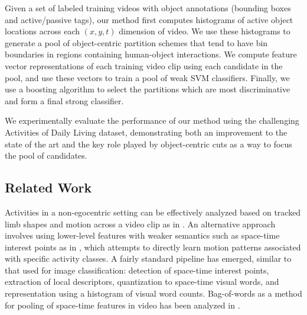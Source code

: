 \documentclass[12pt]{article} %
\begin{document}
  Given a set of labeled training videos with object annotations (bounding boxes and
  active/passive tags), our method first computes histograms of active
  object locations across each $(x,y,t)$ dimension of video. We use these
  histograms to generate a pool of object-centric partition schemes that 
  tend to have bin boundaries in regions containing human-object interactions.
  We compute feature vector representations of each training video clip using each
  candidate in the pool, and use these vectors to train a pool of weak SVM
  classifiers. Finally, we use a boosting algorithm to select the partitions
  which are most discriminative and form a final strong classifier.






  We experimentally evaluate the performance of our method using the
  challenging Activities of Daily Living dataset, demonstrating both an
  improvement to the state of the art and the key role played by
  object-centric cuts as a way to focus the pool of candidates.



	

\subsection{Related Work}

  Activities in a non-egocentric setting can be effectively analyzed based
  on tracked limb shapes and motion across a video clip as in 
  \cite{Ramanan03, Rao01, Rodriguez08}. An
  alternative approach involves using lower-level features with weaker
  semantics such as space-time interest points as in \cite{Schuldt04,
  Laptev08, Marszalek09}, which attempts to directly learn motion patterns
  associated with specific activity classes. A fairly standard pipeline has
  emerged, similar to that used for image classification: detection of space-time
  interest points, extraction of local descriptors, quantization to space-time
  visual words, and representation using a histogram of visual word counts.
  Bag-of-words as a method for pooling of space-time features in video has been
  analyzed in \cite{Choi08, Laptev08, Ramanan12,Marszalek09, Fathi-ICCV2011}.
\end{document}

